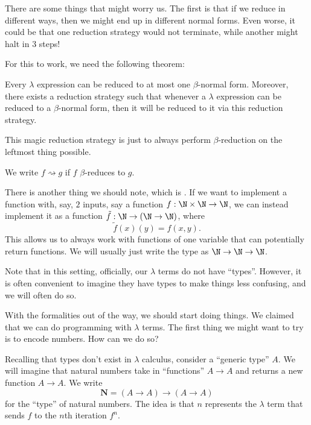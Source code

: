 \documentclass[a4paper]{article}
\begin{document}
There are some things that might worry us. The first is that if we reduce in different ways, then we might end up in different normal forms. Even worse, it could be that one reduction strategy would not terminate, while another might halt in $3$ steps!

For this to work, we need the following theorem:
\begin{thm}
  Every $\lambda$ expression can be reduced to at most one $\beta$-normal form. Moreover, there exists a reduction strategy such that whenever a $\lambda$ expression can be reduced to a $\beta$-normal form, then it will be reduced to it via this reduction strategy.

  This magic reduction strategy is just to always perform $\beta$-reduction on the leftmost thing possible.
\end{thm}

\begin{notation}[$\rightsquigarrow$]
  We write $f \rightsquigarrow g$ if $f$ $\beta$-reduces to $g$.
\end{notation}
There is another thing we should note, which is . If we want to implement a function with, say, $2$ inputs, say a function $f: \N \times \N \to \N$, we can instead implement it as a function $\tilde{f}:\N \to (\N \to \N)$, where
\[
  \tilde{f}(x)(y) = f(x, y).
\]
This allows us to always work with functions of one variable that can potentially return functions. We will usually just write the type as $\N \to \N \to \N$.

Note that in this setting, officially, our $\lambda$ terms do not have ``types''. However, it is often convenient to imagine they have types to make things less confusing, and we will often do so.

With the formalities out of the way, we should start doing things. We claimed that we can do programming with $\lambda$ terms. The first thing we might want to try is to encode numbers. How can we do so?

Recalling that types don't exist in $\lambda$ calculus, consider a ``generic type'' $A$. We will imagine that natural numbers take in ``functions'' $A \to A$ and returns a new function $A \to A$. We write
\[
  \mathbf{N} = (A \to A) \to (A \to A)
\]
for the ``type'' of natural numbers. The idea is that $n$ represents the $\lambda$ term that sends $f$ to the $n$th iteration $f^n$.
\end{document}
